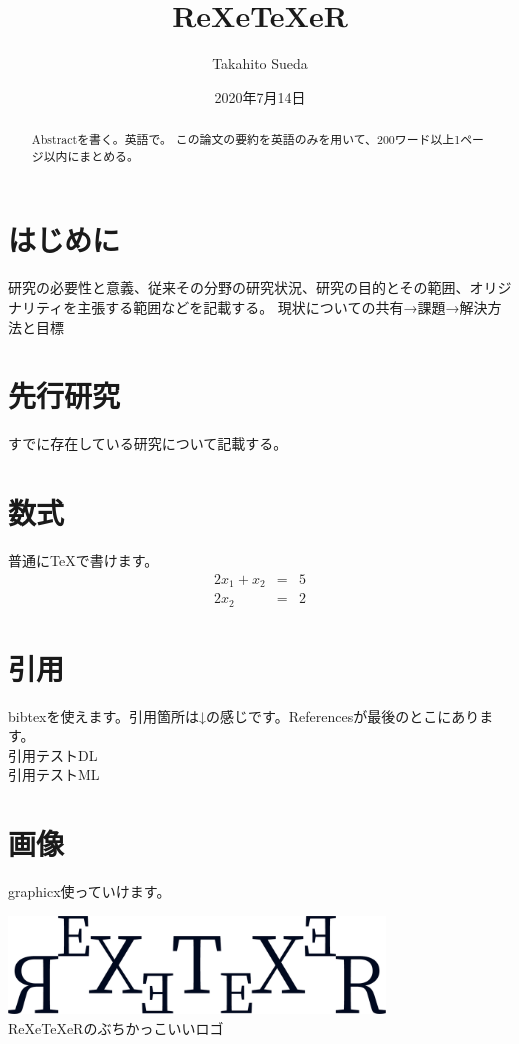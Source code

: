 \documentclass[a4paper]{article} %
\title{ReXeTeXeR}
\author{Takahito Sueda}
\date{2020年7月14日}
\begin{document}
  \maketitle

  \begin{abstract}
    Abstractを書く。英語で。
    この論文の要約を英語のみを用いて、200ワード以上1ページ以内にまとめる。
  \end{abstract}

  \tableofcontents

  \section{はじめに} %
  \label{sec1}
  研究の必要性と意義、従来その分野の研究状況、研究の目的とその範囲、オリジナリティを主張する範囲などを記載する。
  現状についての共有→課題→解決方法と目標

  \section{先行研究} %
  すでに存在している研究について記載する。

  \section{数式}
  普通に{\TeX}で書けます。
  \begin{eqnarray}
    2x_1 + x_2 & = & 5 \\
    2x_2 & = & 2
  \end{eqnarray}

  \section{引用}
  bibtexを使えます。引用箇所は↓の感じです。Referencesが最後のとこにあります。\\
  引用テストDL\cite{lecun2015deep} \\
  引用テストML\cite{michie1994machine}

  \section{画像}
  graphicx使っていけます。
  \begin{center}
    \includegraphics[width=10cm]{img/logo.png} \\
    ReXeTeXeRのぶちかっこいいロゴ
  \end{center}
\end{document}
